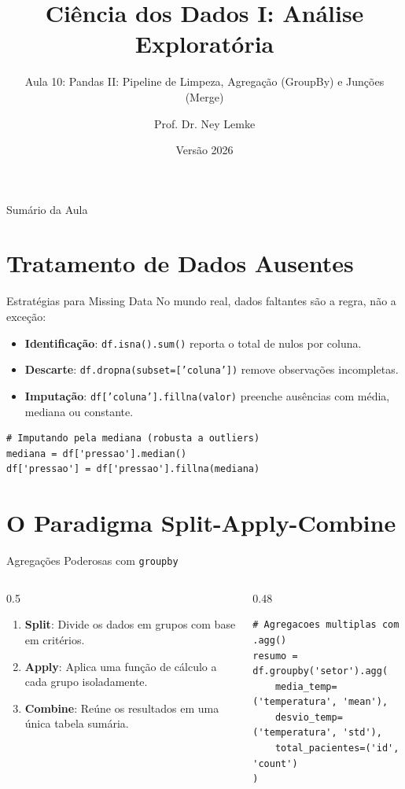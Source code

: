 \documentclass[aspectratio=169, 10pt]{beamer}
\title[Aula 10 - Pandas II: ETL]{Ciência dos Dados I: Análise Exploratória}
\subtitle{Aula 10: Pandas II: Pipeline de Limpeza, Agregação (GroupBy) e Junções (Merge)}
\author{Prof. Dr. Ney Lemke}
\institute{UNESP -- Instituto de Biociências de Botucatu}
\date{Versão 2026}
\begin{document}
\frame{\titlepage}

\begin{frame}{Sumário da Aula}
  \tableofcontents
\end{frame}

\section{Tratamento de Dados Ausentes}

\begin{frame}[fragile]{Estratégias para Missing Data}
  No mundo real, dados faltantes são a regra, não a exceção:
  \begin{itemize}
    \item \textbf{Identificação}: \texttt{df.isna().sum()} reporta o total de nulos por coluna.
    \item \textbf{Descarte}: \texttt{df.dropna(subset=['coluna'])} remove observações incompletas.
    \item \textbf{Imputação}: \texttt{df['coluna'].fillna(valor)} preenche ausências com média, mediana ou constante.
  \end{itemize}
  \begin{lstlisting}
# Imputando pela mediana (robusta a outliers)
mediana = df['pressao'].median()
df['pressao'] = df['pressao'].fillna(mediana)
  \end{lstlisting}
\end{frame}

\section{O Paradigma Split-Apply-Combine}

\begin{frame}[fragile]{Agregações Poderosas com \texttt{groupby}}
  \begin{columns}
    \begin{column}{0.5\textwidth}
      \begin{enumerate}
        \item \textbf{Split}: Divide os dados em grupos com base em critérios.
        \item \textbf{Apply}: Aplica uma função de cálculo a cada grupo isoladamente.
        \item \textbf{Combine}: Reúne os resultados em uma única tabela sumária.
      \end{enumerate}
    \end{column}
    \begin{column}{0.48\textwidth}
      \begin{lstlisting}
# Agregacoes multiplas com .agg()
resumo = df.groupby('setor').agg(
    media_temp=('temperatura', 'mean'),
    desvio_temp=('temperatura', 'std'),
    total_pacientes=('id', 'count')
)
      \end{lstlisting}
    \end{column}
  \end{columns}
\end{frame}
\end{document}
